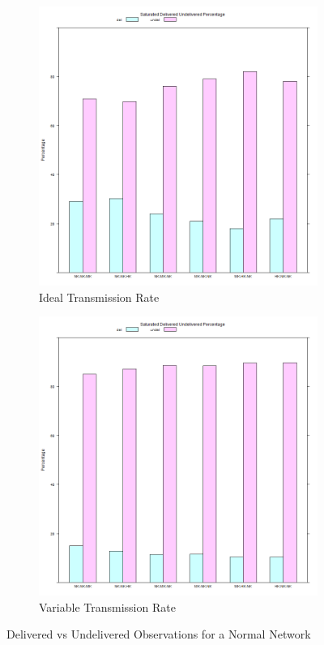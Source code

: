 	\begin{figure}[H]
\centering
\begin{subfigure}{.5\textwidth}
  \centering
\includegraphics[width=\linewidth]{Chap7/figures/plots/saturated_ideal/delvsundel_percent.png}
  \caption{Ideal Transmission Rate}
\label{fig:sim:res:sat:ideal:delundel}
\end{subfigure}%
\begin{subfigure}{.5\textwidth}
  \centering
	\includegraphics[width=\linewidth]{Chap7/figures/plots/saturated_variable/delvsundel_percent.png}
  \caption{Variable Transmission Rate}
	\label{fig:sim:res:sat:variable:delundel}
\end{subfigure}
\caption{Delivered vs Undelivered Observations for a Normal Network}
\end{figure}

